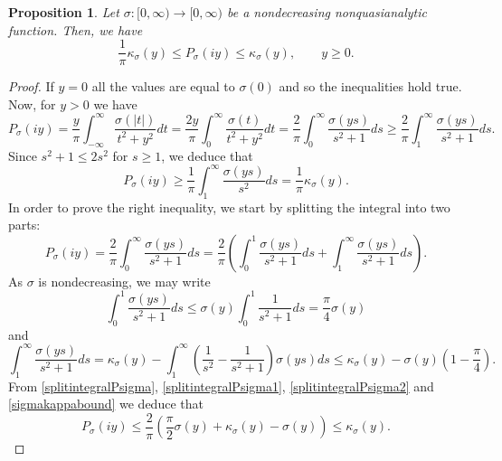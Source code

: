 \documentclass[11pt,a4paper]{article}
\theoremstyle{plain}
\newtheorem{prop}[theo]{Proposition}
\theoremstyle{definition}
\newcommand{\ka}{\kappa}
\begin{document}
\begin{prop}
Let $\sigma:[0,\infty)\to [0,\infty)$ be a nondecreasing nonquasianalytic function. Then, we have
	\begin{equation}\label{kappaPbound}
		\frac{1}{\pi}\ka_\sigma(y)\leq P_\sigma(iy)\leq \ka_\sigma(y),\qquad y\geq0.
	\end{equation}
\end{prop}
\begin{proof}
	If $y=0$ all the values are equal to $\sigma(0)$ and so the inequalities hold true. Now, for $y>0$ we have
\begin{equation*}
P_\sigma(iy)=\frac{y}{\pi}\int_{-\infty}^{\infty}\frac{\sigma(|t|)}{t^2+y^2}dt=
\frac{2y}{\pi}\int_{0}^{\infty}\frac{\sigma(t)}{t^2+y^2}dt=\frac{2}{\pi}\int_{0}^{\infty}\frac{\sigma(ys)}{s^2+1}ds\geq \frac{2}{\pi}\int_{1}^{\infty}\frac{\sigma(ys)}{s^2+1}ds.
\end{equation*}
%
Since $s^2+1\leq 2s^2$ for $s\geq 1$, we deduce that
	\begin{equation*}
		P_\sigma(iy)\geq %
\frac{1}{\pi}\int_{1}^{\infty}\frac{\sigma(ys)}{s^2}ds=\frac{1}{\pi}\ka_\sigma(y).
	\end{equation*}
In order to prove the right inequality, we start by splitting the integral into two parts:
	\begin{equation}\label{splitintegralPsigma}
P_\sigma(iy)=\frac{2}{\pi}\int_{0}^{\infty}\frac{\sigma(ys)}{s^2+1}ds= \frac{2}{\pi}\left(\int_{0}^{1}\frac{\sigma(ys)}{s^2+1}ds + \int_{1}^{\infty}\frac{\sigma(ys)}{s^2+1}ds\right).
	\end{equation}
As $\sigma$ is nondecreasing, we may write
	\begin{equation}\label{splitintegralPsigma1}
\int_{0}^{1}\frac{\sigma(ys)}{s^2+1}ds\leq\sigma(y)\int_{0}^{1}\frac{1}{s^2+1}ds=\frac{\pi}{4}\sigma(y)
	\end{equation}
and
	\begin{equation}\label{splitintegralPsigma2}
\int_{1}^{\infty}\frac{\sigma(ys)}{s^2+1}ds=\ka_\sigma(y)-\int_{1}^{\infty}\left( \frac{1}{s^2}-\frac{1}{s^2+1}\right)\sigma(ys)ds\leq  \ka_\sigma(y)- \sigma(y)\left(1-\frac{\pi}{4}\right).
	\end{equation}
From \eqref{splitintegralPsigma}, \eqref{splitintegralPsigma1}, \eqref{splitintegralPsigma2} and \eqref{sigmakappabound} we deduce that
	\begin{equation*}
		P_\sigma(iy)\leq \frac{2}{\pi}\left(\frac{\pi}{2}\sigma(y) +\ka_\sigma(y)- \sigma(y)\right)\leq \ka_\sigma(y).
	\end{equation*}
\end{proof}
\end{document}
